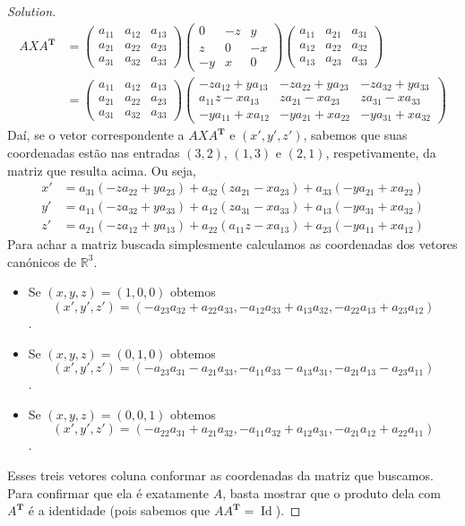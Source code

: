 \begin{proof}[Solution]
\begin{align*}AXA^{\mathbf{T}}&=\begin{pmatrix}a_{11}&a_{12}&a_{13}\\ a_{21}&a_{22}&a_{23}\\ a_{31}&a_{32}&a_{33}\end{pmatrix}\begin{pmatrix}0&-z&y\\ z&0&-x\\ -y&x&0\end{pmatrix}\begin{pmatrix}a_{11}&a_{21}&a_{31}\\ a_{12}&a_{22}&a_{32}\\ a_{13}&a_{23}&a_{33}\end{pmatrix}\\
&=\begin{pmatrix}a_{11}&a_{12}&a_{13}\\ a_{21}&a_{22}&a_{23}\\ a_{31}&a_{32}&a_{33}\end{pmatrix}\begin{pmatrix}-za_{12}+ya_{13}&-za_{22}+ya_{23}&-za_{32}+ya_{33}\\ a_{11}z-xa_{13}&za_{21}-xa_{23}&za_{31}-xa_{33}\\ -ya_{11}+xa_{12}&-ya_{21}+xa_{22}&-ya_{31}+xa_{32}\end{pmatrix}\end{align*}
Daí, se o vetor correspondente a $AXA^{\mathbf{T}}$ e $(x',y',z')$, sabemos que suas coordenadas estão nas entradas $(3,2)$, $(1,3)$ e $(2,1)$, respetivamente, da matriz que resulta acima. Ou seja,
\begin{align*}
	x'&=a_{31}(-za_{22}+ya_{23})+a_{32}(za_{21}-xa_{23})+a_{33}(-ya_{21}+xa_{22})\\
	y'&=a_{11}(-za_{32}+ya_{33})+a_{12}(za_{31}-xa_{33})+a_{13}(-ya_{31}+xa_{32})\\
	z'&=a_{21}(-za_{12}+ya_{13})+a_{22}(a_{11}z-xa_{13})+a_{23}(-ya_{11}+xa_{12})
\end{align*}
Para achar a matriz buscada simplesmente calculamos as coordenadas dos vetores canónicos de $\mathbb{R}^{3}$.

\begin{itemize}
\item Se $(x,y,z)=(1,0,0)$ obtemos  \[(x',y',z')=(-a_{23}a_{32}+a_{22}a_{33},-a_{12}a_{33}+a_{13}a_{32},-a_{22}a_{13}+a_{23}a_{12})\].
\item Se $(x,y,z)=(0,1,0)$ obtemos  \[(x',y',z')=(-a_{23}a_{31}-a_{21}a_{33},-a_{11}a_{33}-a_{13}a_{31},-a_{21}a_{13}-a_{23}a_{11})\].
\item Se $(x,y,z)=(0,0,1)$ obtemos  \[(x',y',z')=(-a_{22}a_{31}+a_{21}a_{32},-a_{11}a_{32}+a_{12}a_{31},-a_{21}a_{12}+a_{22}a_{11})\].
\end{itemize}
Esses treis vetores coluna conformar as coordenadas da matriz que buscamos. Para confirmar que ela é exatamente $A$, basta mostrar que o produto dela com $A^{\mathbf{T}}$ é a identidade (pois sabemos que $A A^{\mathbf{T}}=\operatorname{Id}$).


\end{proof}
